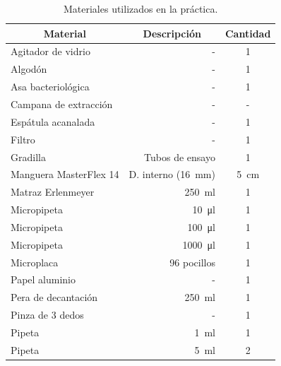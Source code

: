 \documentclass{ITESO-Report}
\begin{document}
\begin{table}[H]
    \centering
    \caption{Materiales utilizados en la práctica.}
    \begin{tabular}{lrc}
        \toprule
        \multicolumn{1}{c}{\textbf{Material}} & \multicolumn{1}{c}{\textbf{Descripción}} & \multicolumn{1}{c}{\textbf{Cantidad}}\\ \hline
            Agitador de   vidrio     & -                            & \num{1}   \\
            Algodón                  & -                            & \num{1}   \\
            Asa   bacteriológica     & -                            & \num{1}   \\
            Campana de extracción    & -                            & -   \\
            Espátula   acanalada     & -                            & \num{1}   \\
            Filtro                   & -                            & \num{1}   \\
            Gradilla                 & Tubos de ensayo              & \num{1}   \\
            Manguera MasterFlex   14 & D. interno (\qty{16}{\mm})   & \qty{5}{\cm} \\
            Matraz   Erlenmeyer      & \qty{250}{\ml}               & \num{1}   \\
            Micropipeta              & \qty{10}{\micro\l}           & \num{1}   \\
            Micropipeta              & \qty{100}{\micro\l}          & \num{1}   \\
            Micropipeta              & \qty{1000}{\micro\l}         & \num{1}   \\
            Microplaca               & 96 pocillos                  & \num{1}   \\
            Papel aluminio           & -                            & \num{1}   \\
            Pera de   decantación    & \qty{250}{\ml}               & \num{1}   \\
            Pinza de 3   dedos       & -                            & \num{1}   \\
            Pipeta                   & \qty{1}{\ml}                 & \num{1}   \\
            Pipeta                   & \qty{5}{\ml}                 & \num{2}   \\

\end{tabular}
\end{table}
\end{document}
